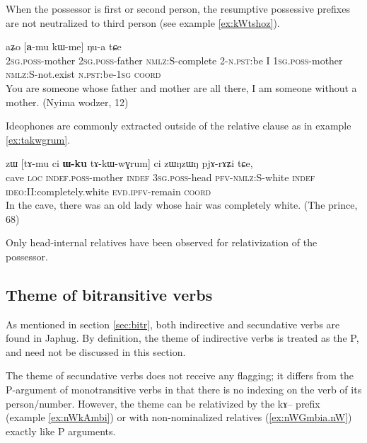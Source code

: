\documentclass[oldfontcommands,oneside,a4paper,11pt]{article}
\newcommand{\ipa}[1]{{\phon #1}} %
\begin{document}
When the possessor is   first or second person,  the resumptive possessive prefixes  are not neutralized to third person (see example \ref{ex:kWtshoz}).
        \begin{exe}
   \ex \label{ex:kWtshoz}
 \gll 
[\ipa{\textbf{nɤ}-mu}   	\ipa{\textbf{nɤ}-wa}   	\ipa{kɯ-tshoz}]   	\ipa{tɯ-ŋu,}   	\ipa{aʑo}   	[\ipa{\textbf{a}-mu}   	\ipa{kɯ-me}]   	\ipa{ŋu-a}   	\ipa{tɕe}    \\
\textsc{2sg.poss}-mother \textsc{2sg.poss}-father \textsc{nmlz:S}-complete 2-\textsc{n.pst:}be I \textsc{1sg.poss}-mother \textsc{nmlz:S}-not.exist \textsc{n.pst:}be-\textsc{1sg} \textsc{coord} \\
\glt You are someone whose father and mother are all there, I am someone without a mother. (Nyima wodzer, 12)
\end{exe}

Ideophones are commonly extracted outside of the relative clause as in example \ref{ex:takwgrum}.

     \begin{exe}
   \ex \label{ex:takwgrum}
 \gll \ipa{praʁkhaŋ}   	\ipa{zɯ}   	[\ipa{tɤ-mu}   	\ipa{ci}   	\textbf{\ipa{ɯ-ku}}   	\ipa{tɤ-kɯ-wɣrum}]   	 	\ipa{ci} \ipa{zɯŋzɯŋ}    	\ipa{pjɤ-rɤʑi}   	\ipa{tɕe,}        \\
cave \textsc{loc} \textsc{indef.poss}-mother \textsc{indef} \textsc{3sg.poss}-head \textsc{pfv-nmlz:}S-white \textsc{indef} \textsc{ideo}:II:completely.white \textsc{evd.ipfv}-remain \textsc{coord}  \\
\glt In the cave, there was an old lady whose hair was completely white. (The prince, 68)
\end{exe}

 
Only head-internal relatives have been observed for relativization of the possessor.
% 

\subsection{Theme of bitransitive verbs}  \label{sec:second}
As mentioned in section \ref{sec:bitr}, both indirective and secundative verbs are found in Japhug. By definition, the theme of indirective verbs is treated as the P, and need not be discussed in this section.

The theme of secundative verbs does not receive  any flagging; it differs from the P-argument of monotransitive verbs in that there is no indexing on the verb of its person/number. However, the theme can be relativized by the \ipa{kɤ}-- prefix (example \ref{ex:nWkAmbi}) or with non-nominalized relatives (\ref{ex:nWGmbia.nW}) exactly like P arguments.
\end{document}
